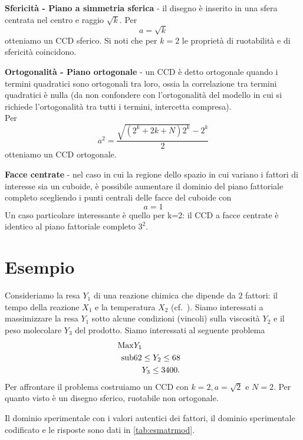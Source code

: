 \documentclass[
  11pt,
]{book}
\begin{document}
\textbf{Sfericità - Piano a simmetria sferica} - il disegno è inserito in una sfera centrata nel centro e raggio \(\sqrt{k}\). \newline
Per
\[
    a=\sqrt{k}
\]
otteniamo un CCD sferico. \newline
Si noti che per \(k=2\) le proprietà di ruotabilità e di sfericità coincidono.

\textbf{Ortogonalità - Piano ortogonale} - un CCD è detto ortogonale quando i termini quadratici sono ortogonali tra loro, ossia la correlazione tra termini quadratici è nulla (da non confondere con l'ortogonalità del modello in cui si richiede l'ortogonalità tra tutti i termini, intercetta compresa).\\
Per
\begin{equation}
    a^2=\frac{\sqrt{(2^k+2k+N)2^k}-2^k}{2}
    \label{eq:CCDOrt}
\end{equation}
otteniamo un CCD ortogonale.

\textbf{Facce centrate} - nel caso in cui la regione dello spazio in cui variano i fattori di interesse sia un cuboide, è possibile aumentare il dominio del piano fattoriale completo scegliendo i punti centrali delle facce del cuboide con
\[
a=1
\]
Un caso particolare interessante è quello per k=2: il CCD a facce centrate è identico al piano fattoriale completo \(3^2\).

\hypertarget{esempio}{%
\section{Esempio}\label{esempio}}

Consideriamo la resa \(Y_1\) di una reazione chimica che dipende da \(2\) fattori: il tempo della reazione \(X_1\) e la temperatura \(X_2\) (cf.~\citep[Ex 11.2]{DesAnExp}).
Siamo interessati a massimizzare la resa \(Y_1\) sotto alcune condizioni (vincoli) sulla viscosità \(Y_2\) e il peso molecolare \(Y_3\) del prodotto. Siamo interessati al seguente problema
\begin{eqnarray*}
  \rm{Max} & Y_1 \\
  \rm{sub}  & 62\leq Y_2 \leq 68 \quad \\
                 & \quad Y_3 \leq 3400.
\end{eqnarray*}
Per affrontare il problema costruiamo un CCD con \(k=2, a=\sqrt{2}\) e \(N=2\). Per quanto visto è un disegno sferico, ruotabile non ortogonale.

Il dominio sperimentale con i valori autentici dei fattori, il dominio sperimentale codificato e le risposte sono dati in \autoref{tab:esmatrmod}.
\newpage
\end{document}
